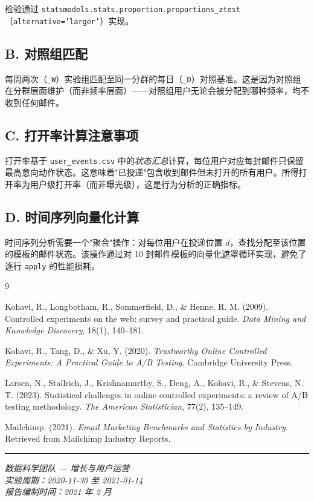 \documentclass[12pt,a4paper]{ctexart}
\begin{document}
检验通过 \texttt{statsmodels.stats.proportion.proportions\_ztest}（\texttt{alternative='larger'}）实现。

\subsection*{B. 对照组匹配}

每周两次（\texttt{\_W}）实验组匹配至同一分群的每日（\texttt{\_D}）对照基准。这是因为对照组在分群层面维护（而非频率层面）——对照组用户无论会被分配到哪种频率，均不收到任何邮件。

\subsection*{C. 打开率计算注意事项}

打开率基于 \texttt{user\_events.csv} 中的\textit{状态汇总}计算，每位用户对应每封邮件只保留最高意向动作状态。这意味着"已投递"包含收到邮件但未打开的所有用户。所得打开率为用户级打开率（而非曝光级），这是行为分析的正确指标。

\subsection*{D. 时间序列向量化计算}

时间序列分析需要一个"聚合"操作：对每位用户在投递位置 $d$，查找分配至该位置的模板的邮件状态。该操作通过对 10 封邮件模板的向量化遮罩循环实现，避免了逐行 \texttt{apply} 的性能损耗。

\clearpage
\begin{thebibliography}{9}

  Kohavi, R., Longbotham, R., Sommerfield, D., \& Henne, R. M. (2009).
  Controlled experiments on the web: survey and practical guide.
  \textit{Data Mining and Knowledge Discovery}, 18(1), 140--181.

  Kohavi, R., Tang, D., \& Xu, Y. (2020).
  \textit{Trustworthy Online Controlled Experiments: A Practical Guide to A/B Testing}.
  Cambridge University Press.

  Larsen, N., Stallrich, J., Krishnamurthy, S., Deng, A., Kohavi, R., \& Stevens, N. T. (2023).
  Statistical challenges in online controlled experiments: a review of A/B testing methodology.
  \textit{The American Statistician}, 77(2), 135--149.

  Mailchimp. (2021).
  \textit{Email Marketing Benchmarks and Statistics by Industry}.
  Retrieved from Mailchimp Industry Reports.

\end{thebibliography}

\vspace{2cm}
\hrule
\vspace{0.5cm}
\begin{center}
  \small
  \textit{数据科学团队 — 增长与用户运营} \\
  \textit{实验周期：2020-11-30 至 2021-01-14} \\
  \textit{报告编制时间：2021 年 2 月}
\end{center}
\end{document}
